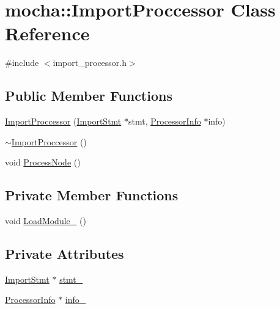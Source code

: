 \hypertarget{classmocha_1_1_import_proccessor}{
\section{mocha::ImportProccessor Class Reference}
\label{classmocha_1_1_import_proccessor}
}


{\ttfamily \#include $<$import\_\-processor.h$>$}

\subsection*{Public Member Functions}
\begin{DoxyCompactItemize}
\item 
\hyperlink{classmocha_1_1_import_proccessor_a7819859f777ab6dc515cc36e06ff3236}{ImportProccessor} (\hyperlink{classmocha_1_1_import_stmt}{ImportStmt} $\ast$stmt, \hyperlink{classmocha_1_1_processor_info}{ProcessorInfo} $\ast$info)
\item 
\hyperlink{classmocha_1_1_import_proccessor_afcd450d608391ff15809103a7424bb46}{$\sim$ImportProccessor} ()
\item 
void \hyperlink{classmocha_1_1_import_proccessor_a4b8740b61a3c98040fb719ce187effd5}{ProcessNode} ()
\end{DoxyCompactItemize}
\subsection*{Private Member Functions}
\begin{DoxyCompactItemize}
\item 
void \hyperlink{classmocha_1_1_import_proccessor_ad717a7d76dee672f64f2617603ad0363}{LoadModule\_\-} ()
\end{DoxyCompactItemize}
\subsection*{Private Attributes}
\begin{DoxyCompactItemize}
\item 
\hyperlink{classmocha_1_1_import_stmt}{ImportStmt} $\ast$ \hyperlink{classmocha_1_1_import_proccessor_a4ab40916756695c1fa816533ec3156d4}{stmt\_\-}
\item 
\hyperlink{classmocha_1_1_processor_info}{ProcessorInfo} $\ast$ \hyperlink{classmocha_1_1_import_proccessor_a1cc25cc43465c8477d83c6b0468701e2}{info\_\-}
\end{DoxyCompactItemize}


